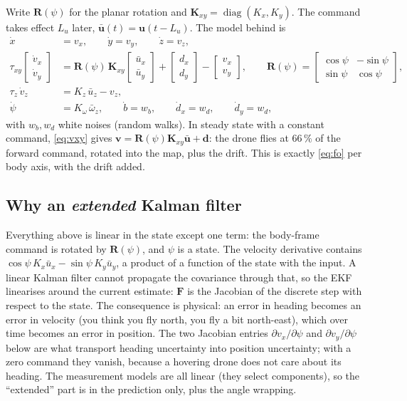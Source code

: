 Write $\mathbf R(\psi)$ for the planar rotation and $\mathbf K_{xy} = \operatorname{diag}(K_x,K_y)$. The command takes effect
$L_u$ later, $\bar{\mathbf u}(t) = \mathbf u(t-L_u)$. The model behind  is
\begin{align}
  \dot x &= v_x, \qquad \dot y = v_y, \qquad \dot z = v_z, \\
  \tau_{xy}\begin{bmatrix}\dot v_x\\ \dot v_y\end{bmatrix} &= \mathbf R(\psi)\,\mathbf K_{xy}
     \begin{bmatrix}\bar u_x\\ \bar u_y\end{bmatrix} + \begin{bmatrix} d_x\\ d_y\end{bmatrix}
     - \begin{bmatrix} v_x\\ v_y\end{bmatrix},
  \qquad \mathbf R(\psi) = \begin{bmatrix}\cos\psi & -\sin\psi\\ \sin\psi & \cos\psi\end{bmatrix}, \label{eq:vxy}\\
  \tau_z\,\dot v_z &= K_z\,\bar u_z - v_z, \\
  \dot\psi &= K_\omega\,\bar\omega_z, \qquad \dot b = w_b, \qquad \dot d_x = w_{d}, \qquad \dot d_y = w_{d},
\end{align}
with $w_b,w_d$ white noises (random walks). In steady state with a constant command, \eqref{eq:vxy} gives
$\mathbf v = \mathbf R(\psi)\mathbf K_{xy}\bar{\mathbf u} + \mathbf d$: the drone flies at $66\,\%$ of the forward command,
rotated into the map, plus the drift. This is exactly \eqref{eq:fo} per body axis, with the drift added.

\subsection{Why an \emph{extended} Kalman filter}

Everything above is linear in the state except one term: the body-frame command is rotated by $\mathbf R(\psi)$, and
$\psi$ is a state. The velocity derivative contains $\cos\psi\,K_x\bar u_x - \sin\psi\,K_y\bar u_y$, a product of a
function of the state with the input. A linear Kalman filter cannot propagate the covariance through that, so the EKF
linearises around the current estimate: $\mathbf F$ is the Jacobian of the discrete step with respect to the state. The
consequence is physical: an error in heading becomes an error in velocity (you think you fly north, you fly a bit
north-east), which over time becomes an error in position. The two Jacobian entries
$\partial v_x/\partial\psi$ and $\partial v_y/\partial\psi$ below are what transport heading uncertainty into position
uncertainty; with a zero command they vanish, because a hovering drone does not care about its heading. The
measurement models are all linear (they select components), so the ``extended'' part is in the prediction only, plus the
angle wrapping.

